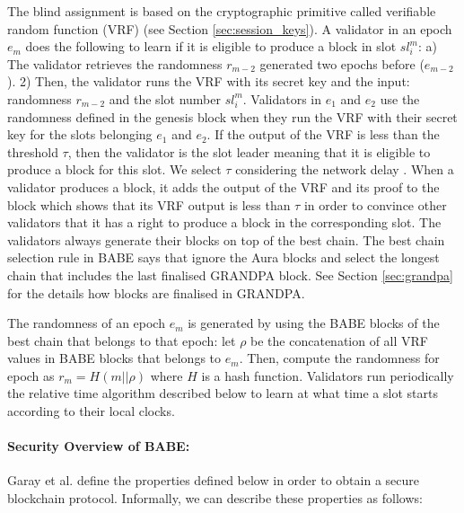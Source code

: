 The blind assignment is based on the cryptographic primitive called verifiable random function (VRF) \cite{vrf} (see Section \ref{sec:session_keys}). 
A validator in an epoch $e_m$  does the following to learn if it is eligible to produce a block in slot $sl_i^m$: a) The validator retrieves the randomness $r_{m-2}$ generated two epochs %
before ($e_{m-2}$). 2) Then, the validator runs the VRF with its secret key and the input:  randomness $r_{m-2}$ and the slot number $ sl_i^m $. Validators in $e_1$ and $e_2$ use the randomness defined in the genesis block when they run the VRF with their secret key for the slots belonging $e_1$ and $e_2$. If the output of the VRF is less than the threshold $ \tau $, then the validator is the slot leader meaning that it is eligible to produce a block for this slot. We select $\tau$ considering the network delay \cite{babe}. 
When a validator produces a block, it adds the output of the VRF and its proof to the block which shows that its VRF output is less than $\tau$  in order to convince other validators that it has a right to produce a block in the corresponding slot. The validators always generate their blocks on top of the best chain.
The best chain selection rule in BABE says that ignore the Aura blocks and select the longest chain that includes the last finalised GRANDPA block. See Section \ref{sec:grandpa} for the details how blocks are finalised in GRANDPA.

The randomness of an epoch $e_m$ is generated by using the BABE blocks of the best chain that belongs to that epoch: let \(\rho\) be the concatenation of all  VRF values in BABE blocks that belongs to $e_m$. Then, compute the randomness for epoch  as $r_{m} = H(m
||\rho)$ where $ H $ is a hash function. Validators run periodically the relative time algorithm described below to learn at what time a slot starts according to their local clocks.




\paragraph{Security Overview of BABE:} Garay et al. \cite{backbone} define the properties defined below in order to obtain a secure blockchain protocol. Informally, we can describe these properties as follows:

